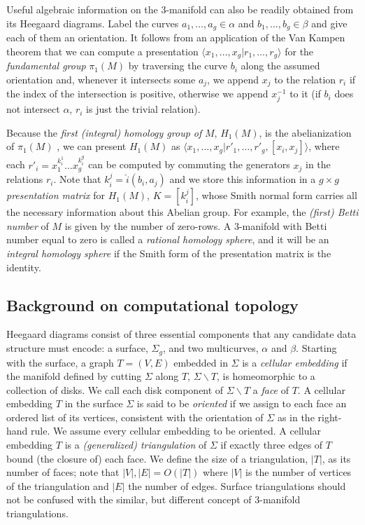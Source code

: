 \documentclass[11pt]{amsart}
\numberwithin{equation}{section}
\theoremstyle{plain}
\theoremstyle{definition}
\begin{document}
Useful algebraic information on the 3-manifold can also be readily obtained from its Heegaard diagrams.
Label the curves $a_1,\dots,a_g\in\alpha$ and $b_1,\dots,b_g\in \beta$ and give each of them an orientation. 
It follows from an application of the Van Kampen theorem \cite{hatcher2002algebraic, hempel20223, johnson2006notes} that we can compute a presentation $\langle x_1,\dots,x_g|r_1,\dots, r_g\rangle$ for the \emph{fundamental group} $\pi_1(M)$ by traversing the curve $b_i$ along the assumed orientation and, whenever it intersects some $a_j$, we append $x_j$ to the relation $r_i$ if the index of the intersection is positive, otherwise we append $x_j^{-1}$ to it (if $b_i$ does not intersect $\alpha$, $r_i$ is just the trivial relation). 

Because the \textit{first (integral) homology group of} $M$, $H_1(M)$, is the abelianization of $\pi_1(M)$ \cite{hatcher2002algebraic},
we can present $H_1(M)$ as $ \langle x_1,\dots,x_g| r'_1,\dots, r'_g, [x_i,x_j]\rangle$, where each $r'_i= x_1^{k_i^1}\dots x_g^{k_i^g}$ can be computed by commuting the generators $x_j$ in the relations $r_i$.
Note that $k_i^j=\hat{i}(b_i, a_j)$ and we store this information in a $g\times g$ \textit{presentation matrix} for $H_1(M)$, $K=[k_i^j]$, whose Smith normal form carries all the necessary information about this Abelian group. 
For example, the \textit{(first) Betti number} of $M$ is given by the number of zero-rows. 
A 3-manifold with Betti number equal to zero is called a \textit{rational homology sphere}, and it will be an \textit{integral homology sphere} if the Smith form of the presentation matrix is the identity.

\subsection{Background on computational topology}
Heegaard diagrams consist of three essential components that any candidate data structure must encode: a surface, $\Sigma_g$, and two multicurves, $\alpha$ and $\beta$.
Starting with the surface, a graph $T=(V,E)$ embedded in $\Sigma$ is a \textit{cellular embedding} if the manifold defined by cutting $\Sigma$ along $T$, $\Sigma\backslash T$, is homeomorphic to a collection of disks. 
We call each disk component of $\Sigma\backslash T$ a \textit{face} of $T$.
A cellular embedding $T$ in the surface $\Sigma$ is said to be \textit{oriented} if we assign to each face an ordered list of its vertices, consistent with the orientation of $\Sigma$ as in the right-hand rule. 
We assume every cellular embedding to be oriented.
A cellular embedding $T$ is a \textit{(generalized) triangulation} of $\Sigma$ if exactly three edges of $T$ bound (the closure of) each face. 
We define the size of a triangulation, $|T|$, as its number of faces; note that $|V|,|E|=O(|T|)$ where $|V|$ is the number of vertices of the triangulation and $|E|$ the number of edges. 
Surface triangulations should not be confused with the similar, but different concept of 3-manifold triangulations.
\end{document}

